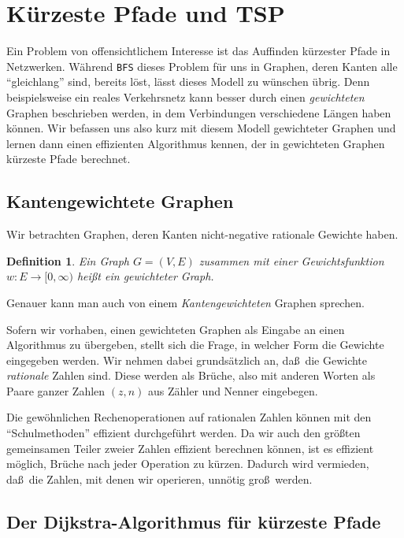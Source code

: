 \documentclass[10pt,reqno]{amsart}
\numberwithin{equation}{section}
\newtheorem{definition}{Definition}[section]
\begin{document}
\section{K\"urzeste Pfade und TSP}\label{sec_shortest_path}

\noindent
Ein Problem von offensichtlichem Interesse ist das Auffinden k\"urzester Pfade in Netzwerken.
W\"ahrend {\tt BFS} dieses Problem f\"ur uns in Graphen, deren Kanten alle ``gleichlang'' sind, bereits l\"ost, l\"asst dieses Modell zu w\"unschen \"ubrig.
Denn beispielsweise ein reales Verkehrsnetz kann besser durch einen {\em gewichteten} Graphen beschrieben werden, in dem Verbindungen verschiedene L\"angen haben k\"onnen.
Wir befassen uns also kurz mit diesem Modell gewichteter Graphen und lernen dann einen effizienten Algorithmus kennen, der in gewichteten Graphen k\"urzeste Pfade berechnet.

\subsection{Kantengewichtete Graphen}\label{sec_weighted}
Wir betrachten Graphen, deren Kanten nicht-negative rationale Gewichte haben.

\begin{definition}\label{deg_weighted}
	Ein Graph $G=(V,E)$ zusammen mit einer Gewichtsfunktion $w:E\to[0,\infty)$ hei\ss t ein {\em gewichteter Graph}.
\end{definition}

\noindent
Genauer kann man auch von einem {\em Kantengewichteten} Graphen sprechen.

Sofern wir vorhaben, einen gewichteten Graphen als Eingabe an einen Algorithmus zu \"ubergeben, stellt sich die Frage, in welcher Form die Gewichte eingegeben werden.
Wir nehmen dabei grunds\"atzlich an, da\ss\ die Gewichte {\em rationale} Zahlen sind.
Diese werden als Br\"uche, also mit anderen Worten als Paare ganzer Zahlen $(z,n)$ aus Z\"ahler und Nenner eingebegen.

Die gew\"ohnlichen Rechenoperationen auf rationalen Zahlen k\"onnen mit den ``Schulmethoden'' effizient durchgef\"uhrt werden.
Da wir auch den gr\"o\ss ten gemeinsamen Teiler zweier Zahlen effizient berechnen k\"onnen, ist es effizient m\"oglich, Br\"uche nach jeder Operation zu k\"urzen.
Dadurch wird vermieden, da\ss\ die Zahlen, mit denen wir operieren, unn\"otig gro\ss\ werden.

\subsection{Der Dijkstra-Algorithmus f\"ur k\"urzeste Pfade}\label{sec_dijkstra}
\end{document}
